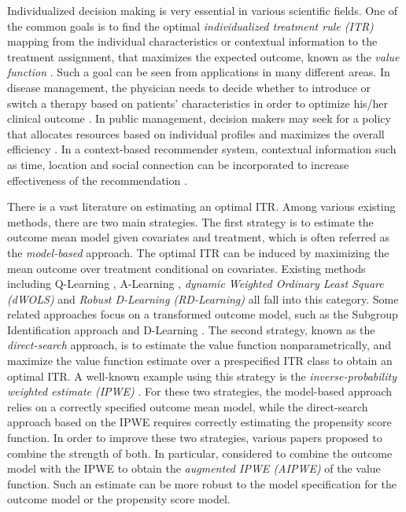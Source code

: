 \documentclass[11pt]{article}
\theoremstyle{definition}
\theoremstyle{remark}
\begin{document}
Individualized decision making is very essential in various scientific fields. One of the common goals is to find the optimal \textit{individualized treatment rule (ITR)} mapping from the individual characteristics or contextual information to the treatment assignment, that maximizes the expected outcome, known as the \textit{value function} \citep{manski2004statistical,qian2011performance}. Such a goal can be seen from applications in many different areas. In disease management, the physician needs to decide whether to introduce or switch a therapy based on patients' characteristics in order to optimize his/her clinical outcome \citep{bertsimas2017personalized}. In public management, decision makers may seek for a policy that allocates resources based on individual profiles and maximizes the overall efficiency \citep{kube2019allocating}. In a context-based recommender system, contextual information such as time, location and social connection can be incorporated to increase effectiveness of the recommendation \citep{aggarwal2016recommender}. 

There is a vast literature on estimating an optimal ITR. Among various existing methods, there are two main strategies. The first strategy is to estimate the outcome mean model given covariates and treatment, which is often referred as the \textit{model-based} approach. The optimal ITR can be induced by maximizing the mean outcome over treatment conditional on covariates. Existing methods including Q-Learning \citep{watkins1989learning,qian2011performance}, A-Learning \citep{murphy2003optimal,lu2013variable,shi2018high}, \textit{dynamic Weighted Ordinary Least Square (dWOLS)} \citep{wallace2015doubly} and \textit{Robust D-Learning (RD-Learning)} \citep{meng2020robust} all fall into this category. Some related approaches focus on a transformed outcome model, such as the Subgroup Identification approach \citep{tian2014simple,chen2017general} and D-Learning \citep{qi2018d,qi2020multi}. The second strategy, known as the \textit{direct-search} approach, is to estimate the value function nonparametrically, and maximize the value function estimate over a prespecified ITR class to obtain an optimal ITR. A well-known example using this strategy is the \textit{inverse-probability weighted estimate (IPWE)} \citep{zhao2012estimating,zhou2017residual,liu2018augmented,kitagawa2018should}. For these two strategies, the model-based approach relies on a correctly specified outcome mean model, while the direct-search approach based on the IPWE requires correctly estimating the propensity score function. In order to improve these two strategies, various papers proposed to combine the strength of both. In particular,  \citet{zhang2012robust,zhao2019efficient,athey2021policy} considered to combine the outcome model with the IPWE to obtain the \textit{augmented IPWE (AIPWE)} of the value function. Such an estimate can be more robust to the model specification for the outcome model or the propensity score model.
\end{document}
